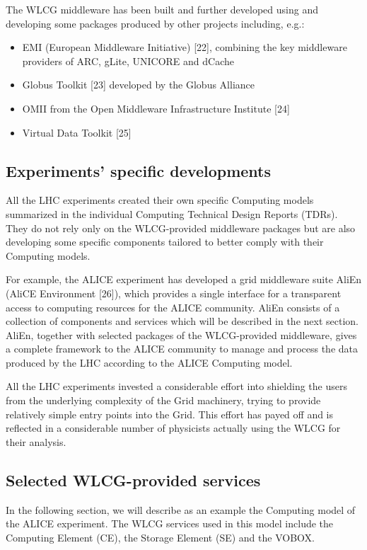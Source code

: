 The WLCG middleware has been built and further developed using and
developing some packages produced by other projects including, e.g.:
%
\begin{itemize}
\item EMI (European Middleware Initiative) [22], combining the key
middleware providers of ARC, gLite, UNICORE and dCache
\item Globus Toolkit [23] developed by the Globus Alliance
\item OMII from the Open Middleware Infrastructure Institute [24]
\item Virtual Data Toolkit [25]
\end{itemize}

\subsection{Experiments' specific developments}
%
All the LHC experiments created their own specific Computing models
summarized in the individual Computing Technical Design Reports (TDRs).
They do not rely only on the WLCG-provided middleware packages
but are also developing
some specific components tailored to better comply with their
Computing models.

For example, the ALICE experiment has developed a grid middleware
suite AliEn  (AliCE Environment [26]), which provides a single
interface for a transparent access to computing resources for the
ALICE community. AliEn consists of a collection of components and
services which will be described in the next section. AliEn, together
with selected packages of the WLCG-provided middleware, gives a
complete framework to the ALICE community to manage and process the
data produced by the LHC according to the ALICE Computing model.

All the LHC experiments invested a considerable effort into
shielding the users from the underlying complexity of the Grid
machinery, trying to provide relatively simple entry points into the
Grid. This effort has payed off and is reflected in a considerable
number of physicists actually using the WLCG for their analysis.

\subsection{Selected WLCG-provided services}
%
In the following section, we will describe as an example the
Computing model of the ALICE experiment. The WLCG services used in
this model include the Computing Element (CE), the Storage Element
(SE) and the VOBOX.

